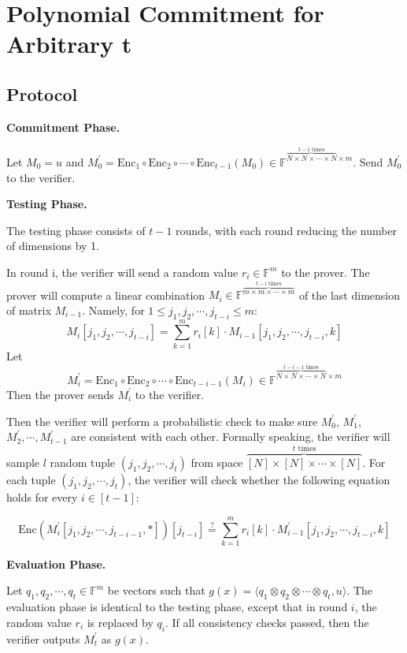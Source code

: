 \section{Polynomial Commitment for Arbitrary t}

\subsection{Protocol}

\textbf{Commitment Phase.}

Let $M_0 = u$ and $ M_0^{\prime} = \text{Enc}_1 \circ \text{Enc}_2 \circ \cdots \circ \text{Enc}_{t-1} (M_0) \in \mathbb{F}^{\overbrace{N \times N \times \cdots \times N}^{t-1 \text{ times}} \times m}$. Send $M_0^{\prime}$ to the verifier.

\textbf{Testing Phase.}

The testing phase consists of $t-1$ rounds, with each round reducing the number of dimensions by 1.

In round i, the verifier will send a random value $r_i \in \mathbb{F}^m$ to the prover.
The prover will compute a linear combination $M_i \in \mathbb{F}^{\overbrace{m \times m \times \cdots \times m}^{t-i \text{ times}}}$ of the last dimension of matrix $M_{i-1}$.
Namely, for $1 \le j_1,j_2, \cdots, j_{t-i} \le m$:
$$M_i[j_1,j_2, \cdots, j_{t-i}] = \sum_{k=1}^{m} r_{i}[k] \cdot M_{i-1}[j_1,j_2, \cdots, j_{t-i}, k]$$
Let 
$$
M_i^\prime = \text{Enc}_1 \circ \text{Enc}_2 \circ \cdots \circ \text{Enc}_{t - i - 1}(M_i)\in \mathbb{F}^{\overbrace{N \times N \times \cdots \times N}^{t-i-1 \text{ times}} \times m}
$$
Then the prover sends $M_i^\prime$ to the verifier.

Then the verifier will perform a probabilistic check to make sure 
$M_0^\prime$, $M_1^\prime$, $M_2^\prime, \cdots, M_{t-1}^\prime$ 
are consistent with each other. Formally speaking, the verifier will sample $l$ random tuple $(j_1, j_2, \cdots, j_t)$ from space $\overbrace{[N] \times [N] \times \cdots \times [N]}^{t \text{ times}}$. 
For each tuple $(j_1, j_2, \cdots, j_t)$,
the verifier will check whether the following equation holds for every $i \in [t-1]$:

$$
    \text{Enc}(M_i^\prime[j_1, j_2, \cdots, j_{t-i-1}, *])[j_{t-i}] \stackrel{?}{=} \sum_{k=1}^m r_i[k] \cdot M_{i-1}^{\prime}[j_1,j_2, \cdots, j_{t-i},k]
$$

\textbf{Evaluation Phase.}

Let $q_1, q_2, \cdots, q_t \in \mathbb{F}^{m}$ be vectors such that $g(x) =\langle q_1 \otimes q_2 \otimes \cdots \otimes q_t, u \rangle $. The evaluation phase is identical to the testing phase, except that in round $i$, the random value $r_i$ is replaced by $q_i$. If all consistency checks passed, then the verifier outputs $M_{t}^{\prime}$ as $g(x)$.

